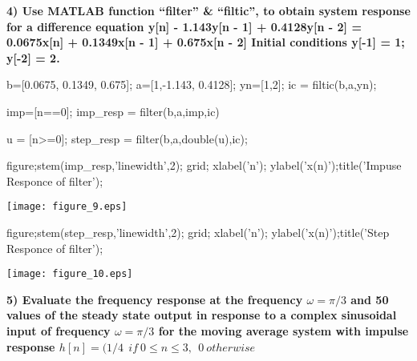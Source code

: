 \documentclass[12pt, onecolumn]{IEEEtran}
\begin{document}
\begin{par}
	\begin{flushleft}
		\textbf{4) Use MATLAB function “filter” \& “filtic”, to obtain system response for a difference equation y[n] - 1.143y[n - 1] + 0.4128y[n - 2] = 0.0675x[n] + 0.1349x[n - 1] + 0.675x[n - 2] Initial conditions y[-1] = 1; y[-2] = 2.}
	\end{flushleft}
\end{par}

\begin{matlabcode}
	b=[0.0675, 0.1349, 0.675];  %
	a=[1,-1.143, 0.4128]; %
	yn=[1,2]; %
	ic = filtic(b,a,yn); %
	
	imp=[n==0]; %
	imp_resp = filter(b,a,imp,ic) %
\end{matlabcode}

\begin{matlabcode}
	u = [n>=0]; %
	step_resp = filter(b,a,double(u),ic); %
	
	figure;stem(imp_resp,'linewidth',2); grid; %
	xlabel('n'); ylabel('x(n)');title('Impuse Responce of filter');
\end{matlabcode}
\begin{center}
	\texttt{[image: figure\_9.eps]}
\end{center}
\begin{matlabcode}
	
	figure;stem(step_resp,'linewidth',2); grid;  %
	xlabel('n'); ylabel('x(n)');title('Step Responce of filter');
\end{matlabcode}
\begin{center}
	\texttt{[image: figure\_10.eps]}
\end{center}

\begin{par}
	\begin{flushleft}
		\textbf{5) Evaluate the frequency response at the frequency $\omega  = \pi/3$ and 50 values of the steady state output in response to a complex sinusoidal input of frequency $\omega  = \pi/3$ for the moving average system with impulse response $h[n] = ( 1/4 \ \ if \ 0 \leq  n \leq  3, \ \ 0 \ otherwise$}
	\end{flushleft}
\end{par}
\end{document}
